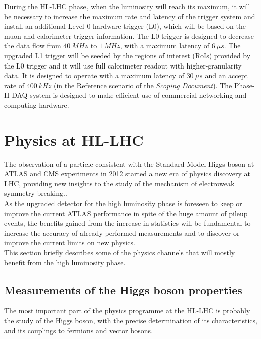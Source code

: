 \documentclass[a4paper,twoside,12pt]{article}
\begin{document}
During the HL-LHC phase, when the luminosity will reach its maximum, it will be necessary
to increase the maximum rate and latency of the trigger system and install an additional Level 0 hardware trigger (L0), which will be based on the muon and calorimeter trigger information. The L0 trigger is designed to decrease the data flow from $40\ MHz$ to $1\ MHz$, with a maximum latency of $6\ \mu s$. The upgraded L1 trigger will be seeded by the regions of interest (RoIs) provided by the L0
trigger and it will use full calorimeter readout with higher-granularity data. It is designed to
operate with a maximum latency of $30\ \mu s$ and an accept rate of $400\ kHz$ (in the Reference scenario of the \textit{Scoping Document}\cite{scoping}). The Phase-II DAQ system is designed to make 
efficient use of commercial networking and computing hardware. 

\clearpage

\section{Physics at HL-LHC}\label{sec:physics}

The observation of a particle consistent with the Standard Model Higgs boson at ATLAS and
CMS experiments in 2012 started a new era of physics discovery at LHC, providing
new insights to the study of the mechanism of electroweak symmetry breaking.\cite{loi}.\\

As the upgraded detector for the high luminosity phase is foreseen to keep or improve
the current ATLAS performance in spite of the huge amount of pileup events, the benefits gained from the increase in statistics
will be fundamental to increase the accuracy of already performed measurements and
to discover or improve the current limits on new physics.\\

This section briefly describes some of the physics channels that will mostly benefit
from the high luminosity phase.

\subsection{Measurements of the Higgs boson properties}
The most important part of the physics programme at the HL-LHC is probably the study of the Higgs boson, with the precise determination of its characteristics, 
and its couplings to fermions and vector bosons\cite{loi}. \\
\end{document}
